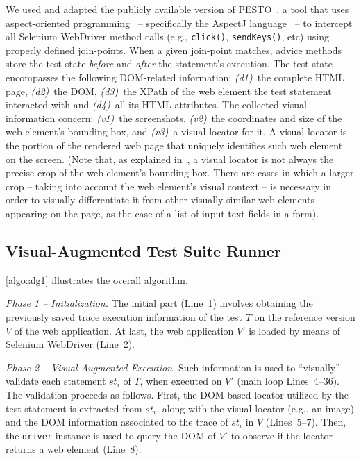 We used and adapted the publicly available version of \textsc{PESTO}~\cite{2014-Stocco-SCAM}, a tool that uses aspect-oriented programming~\cite{aop} -- specifically the AspectJ language~\cite{aspectj} -- to intercept all Selenium WebDriver method calls (e.g., \texttt{click()}, \texttt{sendKeys()}, etc) using properly defined join-points. When a given join-point matches, advice methods store the test state \textit{before} and \textit{after} the statement's execution. The test state encompasses the following DOM-related information: \textit{(d1)}~the complete HTML page, \textit{(d2)}~the DOM, \textit{(d3)}~the XPath of the web element the test statement interacted with and \textit{(d4)}~all its HTML attributes. The collected visual information concern: \textit{(v1)}~the screenshots, \textit{(v2)}~the coordinates and size of the web element's bounding box, and \textit{(v3)}~a visual locator for it. A visual locator is the portion of the rendered web page that uniquely identifies such web element on the screen. (Note that, as explained in~\cite{2014-Stocco-SCAM,2015-Leotta-SAC}, a visual locator is not always the precise crop of the web element's bounding box. There are cases in which a larger crop -- taking into account the web element's visual context --  is necessary in order to visually differentiate it from other visually similar web elements appearing on the page, as the case of a list of input text fields in a form).

\subsection{Visual-Augmented Test Suite Runner}

\autoref{algo:alg1} illustrates the overall algorithm.

\textit{Phase 1 -- Initialization.} 
The initial part (Line~1) involves obtaining the previously saved trace execution information of the test $T$ on the reference version $V$ of the web application. 
At last, the web application $V'$ is loaded by means of Selenium WebDriver (Line~2). 

\textit{Phase 2 -- Visual-Augmented Execution.}
Such information is used to ``visually'' validate each statement $st_i$ of $T$, when executed on $V'$ (main loop Lines~4--36). The validation proceeds as follows. First, the DOM-based locator utilized by the test statement is extracted from $st_i$, along with the visual locator (e.g., an image) and the DOM information associated to the trace of $st_i$ in $V$  (Lines~5--7). Then, the \texttt{driver} instance is used to query the DOM of $V'$ to observe if the locator returns a web element (Line~8). 

